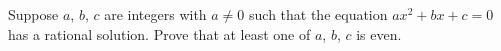 Suppose $a$, $b$, $c$ are integers with $a\ne0$ such that the equation $ax^2+bx+c=0$ has a rational solution. Prove that at least one of $a$, $b$, $c$ is even.
